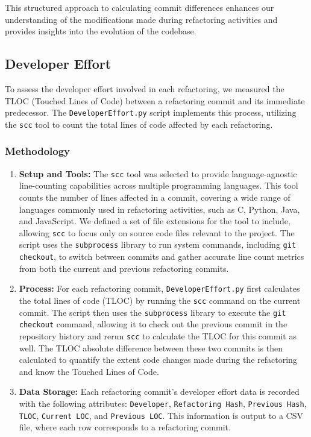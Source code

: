 \documentclass[sigconf]{acmart}
\begin{document}
This structured approach to calculating commit differences enhances our understanding of the modifications made during refactoring activities and provides insights into the evolution of the codebase.


\subsection{Developer Effort}
To assess the developer effort involved in each refactoring, we measured the TLOC (Touched Lines of Code) between a refactoring commit and its immediate predecessor. The \texttt{DeveloperEffort.py} script implements this process, utilizing the \texttt{scc} tool to count the total lines of code affected by each refactoring.

\subsubsection{Methodology}
\begin{enumerate}
    \item \textbf{Setup and Tools:} The \texttt{scc} tool was selected to provide language-agnostic line-counting capabilities across multiple programming languages. This tool counts the number of lines affected in a commit, covering a wide range of languages commonly used in refactoring activities, such as C, Python, Java, and JavaScript. We defined a set of file extensions for the tool to include, allowing \texttt{scc} to focus only on source code files relevant to the project. The script uses the \texttt{subprocess} library to run system commands, including \texttt{git checkout}, to switch between commits and gather accurate line count metrics from both the current and previous refactoring commits.

    \item \textbf{Process:} For each refactoring commit, \texttt{DeveloperEffort.py} first calculates the total lines of code (TLOC) by running the \texttt{scc} command on the current commit. The script then uses the \texttt{subprocess} library to execute the \texttt{git checkout} command, allowing it to check out the previous commit in the repository history and rerun \texttt{scc} to calculate the TLOC for this commit as well. The TLOC absolute difference between these two commits is then calculated to quantify the extent code changes made during the refactoring and know the Touched Lines of Code.

    \item \textbf{Data Storage:} Each refactoring commit’s developer effort data is recorded with the following attributes: \texttt{Developer}, \texttt{Refactoring Hash}, \texttt{Previous Hash}, \texttt{TLOC}, \texttt{Current LOC}, and \texttt{Previous LOC}. This information is output to a CSV file, where each row corresponds to a refactoring commit.
\end{enumerate}
\end{document}
